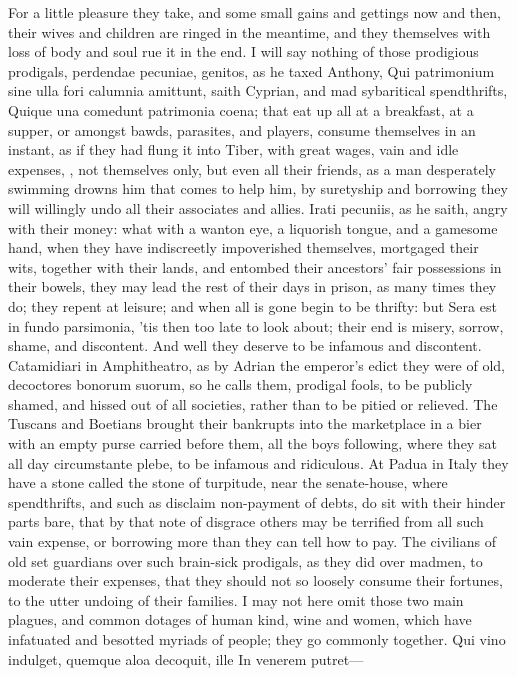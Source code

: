 {For a little pleasure they take, and some small gains and gettings now
and then, their wives and children are ringed in the meantime, and they
themselves with loss of body and soul rue it in the end. I will say
nothing of those prodigious prodigals, perdendae pecuniae, genitos, as
he  taxed Anthony, Qui patrimonium sine ulla fori calumnia
amittunt, saith Cyprian, and mad sybaritical spendthrifts,
Quique una comedunt patrimonia coena; that eat up all at a breakfast,
at a supper, or amongst bawds, parasites, and players, consume
themselves in an instant, as if they had flung it into Tiber,
with great wages, vain and idle expenses, \etc{}, not themselves only, but
even all their friends, as a man desperately swimming drowns him that
comes to help him, by suretyship and borrowing they will willingly undo
all their associates and allies.  Irati pecuniis, as he saith,
angry with their money: what with a wanton eye, a liquorish
tongue, and a gamesome hand, when they have indiscreetly impoverished
themselves, mortgaged their wits, together with their lands, and
entombed their ancestors' fair possessions in their bowels, they may
lead the rest of their days in prison, as many times they do; they
repent at leisure; and when all is gone begin to be thrifty: but Sera
est in fundo parsimonia, 'tis then too late to look about; their
end is misery, sorrow, shame, and discontent. And well they
deserve to be infamous and discontent. Catamidiari in
Amphitheatro, as by Adrian the emperor's edict they were of old,
decoctores bonorum suorum, so he calls them, prodigal fools, to be
publicly shamed, and hissed out of all societies, rather than to be
pitied or relieved. The Tuscans and Boetians brought their
bankrupts into the marketplace in a bier with an empty purse carried
before them, all the boys following, where they sat all day
circumstante plebe, to be infamous and ridiculous. At Padua in
Italy they have a stone called the stone of turpitude, near the
senate-house, where spendthrifts, and such as disclaim non-payment of
debts, do sit with their hinder parts bare, that by that note of
disgrace others may be terrified from all such vain expense, or
borrowing more than they can tell how to pay. The civilians of
old set guardians over such brain-sick prodigals, as they did over
madmen, to moderate their expenses, that they should not so loosely
consume their fortunes, to the utter undoing of their families.
I may not here omit those two main plagues, and common dotages of human
kind, wine and women, which have infatuated and besotted myriads of
people; they go commonly together.
Qui vino indulget, quemque aloa decoquit, ille
In venerem putret---

}
